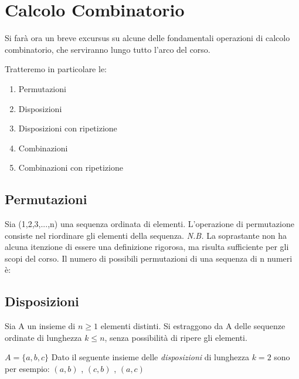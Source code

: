 \section{Calcolo Combinatorio}

Si farà ora un breve excursus su alcune delle fondamentali operazioni di calcolo combinatorio, che serviranno lungo tutto l'arco del corso.

Tratteremo in particolare le:
\begin{enumerate}
    \item Permutazioni
    \item Disposizioni
    \item Disposizioni con ripetizione 
    \item Combinazioni
    \item Combinazioni con ripetizione
    \label{enumerate:Permutazioni}
    \label{enumerate:Disposizioni}
    \label{enumerate:Disposizioni con ripetizione}
    \label{enumerate:Combinazioni}
    \label{enumerate:Combinazioni con ripetizione}
\end{enumerate}

\subsection{Permutazioni}
Sia (1,2,3,...,n) una sequenza ordinata di elementi. L'operazione di permutazione consiste nel riordinare gli elementi della sequenza.
\vspace{10px}
\newline
\textit{N.B.} La soprastante non ha alcuna itenzione di essere una definizione rigorosa, ma risulta sufficiente per gli scopi del corso.
\vspace{5px}
\newline
Il numero di possibili permutazioni di una sequenza di n numeri è: 
\begin{center}
    \scalebox{1.2}{\(\Pi_n=n!\)}
\end{center}

\subsection{Disposizioni}
Sia A un insieme di \(n\geq1\) elementi distinti. Si estraggono da A delle sequenze ordinate di lunghezza \(k\leq n\), senza possibilità di ripere gli elementi.

\begin{example}
\(A=\{ a,b,c \}\)  Dato il seguente insieme delle \textit{disposizioni} di lunghezza \(k=2\) sono per esempio: \((a,b)\) , \((c,b)\) , \((a,c)\)
\end{example}

